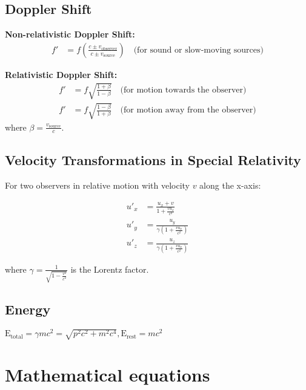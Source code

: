 \documentclass[12pt,a4paper]{article}
\begin{document}
	\subsection*{Doppler Shift}
	
	\textbf{Non-relativistic Doppler Shift:}
	\begin{align}
		f' &= f \left( \frac{c \pm v_{\text{observer}}}{c \pm v_{\text{source}}} \right) \quad \text{(for sound or slow-moving sources)}
	\end{align}
	
	\textbf{Relativistic Doppler Shift:}
	\begin{align}
		f' &= f \sqrt{\frac{1 + \beta}{1 - \beta}} \quad \text{(for motion towards the observer)} \\
		f' &= f \sqrt{\frac{1 - \beta}{1 + \beta}} \quad \text{(for motion away from the observer)}
	\end{align}
	where \( \beta = \frac{v_{\text{source}}}{c} \).
	
	\subsection*{Velocity Transformations in Special Relativity}
	
	For two observers in relative motion with velocity \( v \) along the x-axis:
	
	\begin{align}
		u'_{x} &= \frac{u_{x} + v}{1 + \frac{vu_{x}}{c^2}} \\
		u'_{y} &= \frac{u_{y}}{\gamma(1 + \frac{vu_{x}}{c^2})} \\
		u'_{z} &= \frac{u_{z}}{\gamma(1 + \frac{vu_{x}}{c^2})}
	\end{align}
	
	where \( \gamma = \frac{1}{\sqrt{1 - \frac{v^2}{c^2}}} \) is the Lorentz factor.
	
	\subsection*{Energy}
	$\text{E}_\text{total} = \gamma mc^2 = \sqrt{p^2c^2 + m^2c^4}, \text{E}_\text{rest} = mc^2$
	
	
	\section*{Mathematical equations}
\end{document}
